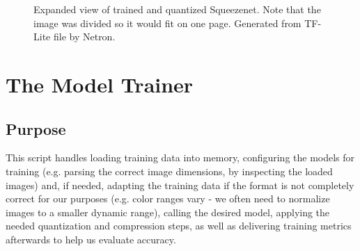 \begin{figure}[!tbp]
\caption{Expanded view of trained and quantized Squeezenet. Note that the image was divided so it would fit on one page. Generated from TF-Lite file by Netron. \cite{netron}}
\label{netron_sqnet}
\end{figure}

\section{The Model Trainer}
\subsection{Purpose}
This script handles loading training data into memory, configuring the models for training (e.g. parsing the correct image dimensions, by inspecting the loaded images) and, if needed, adapting the training data if the format is not completely correct for our purposes (e.g. color ranges vary - we often need to normalize images to a smaller dynamic range), calling the desired model, applying the needed quantization and compression steps, as well as delivering training metrics afterwards to help us evaluate accuracy. 
